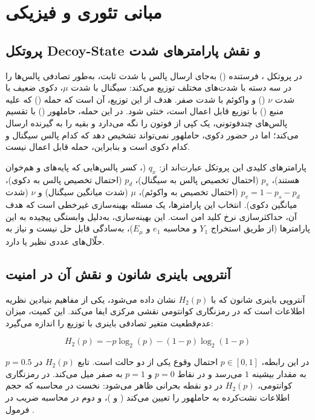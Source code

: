 \section{مبانی تئوری و فیزیکی}

\subsection{پروتکل Decoy-State و نقش پارامترهای شدت}

در پروتکل ، فرستنده () به‌جای ارسال پالس با شدت ثابت، به‌طور تصادفی پالس‌ها را در سه دسته با شدت‌های مختلف توزیع می‌کند: سیگنال با شدت $\mu$، دکوی ضعیف با شدت $\nu$ (\lr{$\nu < \mu$}) و واکوئم با شدت صفر. هدف از این توزیع، آن است که حمله  () که علیه منبع  () با توزیع  قابل اعمال است، خنثی شود. در این حمله، حاملهور () با تقسیم پالس‌های چندفوتونی، یک کپی از فوتون را نگه می‌دارد و بقیه را به گیرنده ارسال می‌کند؛ اما در حضور دکوی، حاملهور نمی‌تواند تشخیص دهد که کدام پالس سیگنال و کدام دکوی است و بنابراین، حمله  قابل اعمال نیست.

پارامترهای کلیدی این پروتکل عبارت‌اند از: $q_x$ (، کسر پالس‌هایی که پایه‌های  و  هم‌خوان هستند)، $p_s$ (احتمال تخصیص پالس به سیگنال)، $p_d$ (احتمال تخصیص پالس به دکوی)، $p_v = 1 - p_s - p_d$ (احتمال تخصیص به واکوئم)، $\mu$ (شدت میانگین سیگنال) و $\nu$ (شدت میانگین دکوی). انتخاب این پارامترها، یک مسئله بهینه‌سازی غیرخطی است که هدف آن، حداکثرسازی نرخ کلید امن است. این بهینه‌سازی، به‌دلیل وابستگی پیچیده  به این پارامترها (از طریق استخراج $Y_1$ و محاسبه $e_1$ و $E_\mu$)، به‌سادگی قابل حل نیست و نیاز به حلّال‌های عددی نظیر  یا  دارد.

\subsection{آنتروپی باینری شانون و نقش آن در امنیت}

آنتروپی باینری شانون که با $H_2(p)$ نشان داده می‌شود، یکی از مفاهیم بنیادین نظریه اطلاعات است که در رمزنگاری کوانتومی نقشی مرکزی ایفا می‌کند. این کمیت، میزان عدم‌قطعیت متغیر تصادفی باینری با توزیع  را اندازه می‌گیرد:

\begin{equation}
	H_2(p) = -p \log_2(p) - (1 - p) \log_2(1 - p)
\end{equation}

در این رابطه، $p \in [0, 1]$ احتمال وقوع یکی از دو حالت است. تابع $H_2(p)$ در $p = 0.5$ به مقدار بیشینه $1$ می‌رسد و در نقاط $p = 0$ و $p = 1$ به صفر میل می‌کند. در رمزنگاری کوانتومی، $H_2(p)$ در دو نقطه بحرانی ظاهر می‌شود: نخست در محاسبه  که حجم اطلاعات نشت‌کرده به حاملهور را تعیین می‌کند ( و )، و دوم در محاسبه ضریب  در فرمول .

